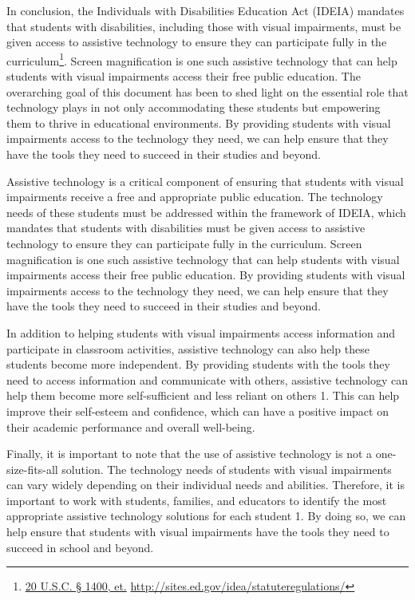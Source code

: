 \documentclass[12pt,letterpaper,twoside]{extreport}
\begin{document}
In conclusion, the Individuals with Disabilities Education Act (IDEIA) mandates that students with disabilities, including those with visual impairments, must be given access to assistive technology to ensure they can participate fully in the curriculum\footnote{\raggedright \href{http://sites.ed.gov/idea/statuteregulations/}{20 U.S.C. § 1400, et.} \url{http://sites.ed.gov/idea/statuteregulations/}}. Screen magnification is one such assistive technology that can help students with visual impairments access their free public education. The overarching goal of this document has been  to shed light on the essential role that technology plays in not only accommodating these students but empowering them to thrive in educational environments. By providing students with visual impairments access to the technology they need, we can help ensure that they have the tools they need to succeed in their studies and beyond.

Assistive technology is a critical component of ensuring that students with visual impairments receive a free and appropriate public education. The technology needs of these students must be addressed within the framework of IDEIA, which mandates that students with disabilities must be given access to assistive technology to ensure they can participate fully in the curriculum. Screen magnification is one such assistive technology that can help students with visual impairments access their free public education. By providing students with visual impairments access to the technology they need, we can help ensure that they have the tools they need to succeed in their studies and beyond.

In addition to helping students with visual impairments access information and participate in classroom activities, assistive technology can also help these students become more independent. By providing students with the tools they need to access information and communicate with others, assistive technology can help them become more self-sufficient and less reliant on others 1. This can help improve their self-esteem and confidence, which can have a positive impact on their academic performance and overall well-being.

Finally, it is important to note that the use of assistive technology is not a one-size-fits-all solution. The technology needs of students with visual impairments can vary widely depending on their individual needs and abilities. Therefore, it is important to work with students, families, and educators to identify the most appropriate assistive technology solutions for each student 1. By doing so, we can help ensure that students with visual impairments have the tools they need to succeed in school and beyond.
\end{document}
